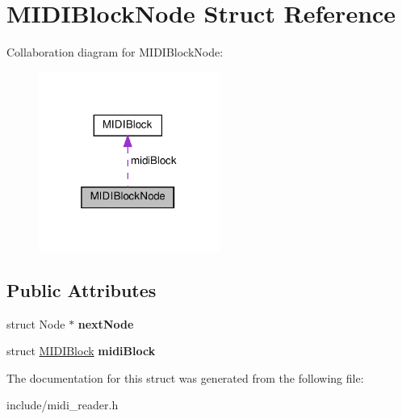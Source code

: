 \hypertarget{structMIDIBlockNode}{}\section{M\+I\+D\+I\+Block\+Node Struct Reference}
\label{structMIDIBlockNode}


Collaboration diagram for M\+I\+D\+I\+Block\+Node\+:\nopagebreak
\begin{figure}[H]
\begin{center}
\leavevmode
\includegraphics[width=169pt]{structMIDIBlockNode__coll__graph}
\end{center}
\end{figure}
\subsection*{Public Attributes}
\begin{DoxyCompactItemize}
\item 
\mbox{\label{structMIDIBlockNode_a3a25e698bcdc86fe868e18d5fd808bc1}} 
struct Node $\ast$ {\bfseries next\+Node}
\item 
\mbox{\label{structMIDIBlockNode_a7bf23ac93c2419cfd492537ffd8d2d03}} 
struct \hyperlink{structMIDIBlock}{M\+I\+D\+I\+Block} {\bfseries midi\+Block}
\end{DoxyCompactItemize}


The documentation for this struct was generated from the following file\+:\begin{DoxyCompactItemize}
\item 
include/midi\+\_\+reader.\+h\end{DoxyCompactItemize}
